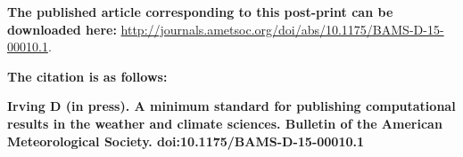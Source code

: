 \textbf{The published article corresponding to this post-print can be downloaded here:}
\url{http://journals.ametsoc.org/doi/abs/10.1175/BAMS-D-15-00010.1}. 

\textbf{The citation is as follows:}    

\textbf{Irving D (in press). A minimum standard for publishing computational results in the weather and climate sciences. Bulletin of the American Meteorological Society. doi:10.1175/BAMS-D-15-00010.1}